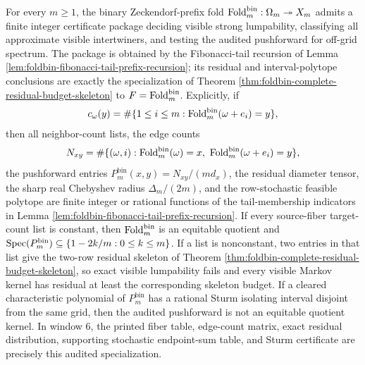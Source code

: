 \begin{proposition}\label{thm:foldbin-family-certificate-algorithm}
For every \(m\ge1\), the binary Zeckendorf-prefix fold \(\operatorname{Fold}_m^{\mathrm{bin}}:\Omega_m\twoheadrightarrow X_m\) admits a finite integer certificate package deciding visible strong lumpability, classifying all approximate visible intertwiners, and testing the audited pushforward for off-grid spectrum.  The package is obtained by the Fibonacci-tail recursion of Lemma \ref{lem:foldbin-fibonacci-tail-prefix-recursion}; its residual and interval-polytope conclusions are exactly the specialization of Theorem \ref{thm:foldbin-complete-residual-budget-skeleton} to \(F=\operatorname{Fold}_m^{\mathrm{bin}}\).  Explicitly, if
\[
c_\omega(y)=\#\{1\le i\le m:\operatorname{Fold}_m^{\mathrm{bin}}(\omega+e_i)=y\},
\]
then all neighbor-count lists, the edge counts
\[
N_{xy}=\#\{(\omega,i):\operatorname{Fold}_m^{\mathrm{bin}}(\omega)=x,
\ \operatorname{Fold}_m^{\mathrm{bin}}(\omega+e_i)=y\},
\]
the pushforward entries \(P_m^{\mathrm{bin}}(x,y)=N_{xy}/(m d_x)\), the residual diameter tensor, the sharp real Chebyshev radius \(\Delta_m/(2m)\), and the row-stochastic feasible polytope are finite integer or rational functions of the tail-membership indicators in Lemma \ref{lem:foldbin-fibonacci-tail-prefix-recursion}.  If every source-fiber target-count list is constant, then \(\operatorname{Fold}_m^{\mathrm{bin}}\) is an equitable quotient and \(\operatorname{Spec}(P_m^{\mathrm{bin}})\subseteq\{1-2k/m:0\le k\le m\}\).  If a list is nonconstant, two entries in that list give the two-row residual skeleton of Theorem \ref{thm:foldbin-complete-residual-budget-skeleton}, so exact visible lumpability fails and every visible Markov kernel has residual at least the corresponding skeleton budget.  If a cleared characteristic polynomial of \(P_m^{\mathrm{bin}}\) has a rational Sturm isolating interval disjoint from the same grid, then the audited pushforward is not an equitable quotient kernel.  In window \(6\), the printed fiber table, edge-count matrix, exact residual distribution, supporting stochastic endpoint-sum table, and Sturm certificate are precisely this audited specialization.
\end{proposition}

